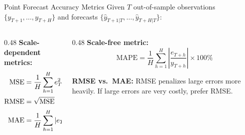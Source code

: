 \documentclass[aspectratio=169, 11pt]{beamer}
\begin{document}

\begin{frame}{Point Forecast Accuracy Metrics}
  Given $T$ out-of-sample observations $\{y_{T+1}, \ldots, y_{T+H}\}$
  and forecasts $\{\hat{y}_{T+1|T}, \ldots, \hat{y}_{T+H|T}\}$:

  \begin{columns}[T]
    \begin{column}{0.48\textwidth}
      \textbf{Scale-dependent metrics:}
      \begin{align*}
        \operatorname{MSE}  &= \frac{1}{H}\sum_{h=1}^{H} e_{T+h}^2 \\[1pt]
        \operatorname{RMSE} &= \sqrt{\operatorname{MSE}} \\[1pt]
        \operatorname{MAE}  &= \frac{1}{H}\sum_{h=1}^{H} |e_{T+h}|
      \end{align*}
    \end{column}
    \begin{column}{0.48\textwidth}
      \textbf{Scale-free metric:}
      \[
        \text{MAPE} = \frac{1}{H}\sum_{h=1}^{H}
                      \left|\frac{e_{T+h}}{y_{T+h}}\right| \times 100\%
      \]
      \begin{warningbox}
        \textbf{RMSE vs.\ MAE:} RMSE penalizes large errors more heavily.
        If large errors are very costly, prefer RMSE.
      \end{warningbox}
    \end{column}
  \end{columns}
\end{frame}
\end{document}
